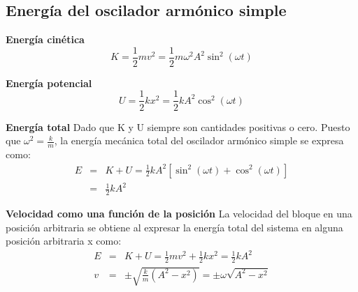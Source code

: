 \subsection{Energía del oscilador armónico simple}

\PN \textbf{Energía cinética}
\begin{equation}
  K = \frac{1}{2} m v^{2} = \frac{1}{2} m \omega^{2} A^{2} \sin^{2} (\omega t)
\end{equation}

\PN \textbf{Energía potencial}
\begin{equation}
  U = \frac{1}{2} k x^{2} = \frac{1}{2} k A^{2} \cos^{2} (\omega t)
\end{equation}

\PN \textbf{Energía total}
\PN Dado que K y U siempre son cantidades positivas o cero. Puesto que $\omega^{2} = \frac{k}{m}$, la energía mecánica
total del oscilador armónico simple se expresa como:
\begin{eqnarray*}
  E &=& K + U = \frac{1}{2} k A^{2} [\sin^{2} (\omega t) + \cos^{2} (\omega t)] \\
  &=& \frac{1}{2} k A^{2}
\end{eqnarray*}

\pagebreak
\PN \textbf{Velocidad como una función de la posición}
\PN La velocidad del bloque en una posición arbitraria se obtiene al expresar la energía total del sistema en alguna
posición arbitraria x como:
\begin{eqnarray*}
  E &=& K + U = \frac{1}{2} m v^{2} + \frac{1}{2} k x^{2} = \frac{1}{2} k A^{2} \\
  v &=& \pm \sqrt{\frac{k}{m} (A^{2} - x^{2})} = \pm \omega \sqrt{A^{2} - x^{2}}
\end{eqnarray*}
